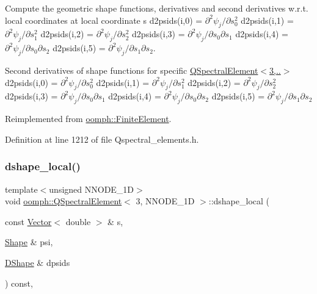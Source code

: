 Compute the geometric shape functions, derivatives and second derivatives w.\+r.\+t. local coordinates at local coordinate s d2psids(i,0) = $ \partial ^2 \psi_j / \partial s_0^2 $ d2psids(i,1) = $ \partial ^2 \psi_j / \partial s_1^2 $ d2psids(i,2) = $ \partial ^2 \psi_j / \partial s_2^2 $ d2psids(i,3) = $ \partial ^2 \psi_j / \partial s_0 \partial s_1 $ d2psids(i,4) = $ \partial ^2 \psi_j / \partial s_0 \partial s_2 $ d2psids(i,5) = $ \partial ^2 \psi_j / \partial s_1 \partial s_2 $. 

Second derivatives of shape functions for specific \hyperlink{classoomph_1_1QSpectralElement_3_013_00_01NNODE__1D_01_4_a16dc807addb7036c30d794d65d2a0b73}{Q\+Spectral\+Element$<$3,..$>$} d2psids(i,0) = $ \partial ^2 \psi_j / \partial s_0^2 $ d2psids(i,1) = $ \partial ^2 \psi_j / \partial s_1^2 $ d2psids(i,2) = $ \partial ^2 \psi_j / \partial s_2^2 $ d2psids(i,3) = $ \partial ^2 \psi_j / \partial s_0 \partial s_1 $ d2psids(i,4) = $ \partial ^2 \psi_j / \partial s_0 \partial s_2 $ d2psids(i,5) = $ \partial ^2 \psi_j / \partial s_1 \partial s_2 $ 

Reimplemented from \hyperlink{classoomph_1_1FiniteElement_a53e5051582d9da07b9d35da9debd0cd7}{oomph\+::\+Finite\+Element}.



Definition at line 1212 of file Qspectral\+\_\+elements.\+h.

\mbox{\label{classoomph_1_1QSpectralElement_3_013_00_01NNODE__1D_01_4_ace199b14b89f1816a92e94f94cd808ff}} 
\subsubsection{\texorpdfstring{dshape\+\_\+local()}{dshape\_local()}}
{\footnotesize\ttfamily template$<$unsigned N\+N\+O\+D\+E\+\_\+1D$>$ \\
void \hyperlink{classoomph_1_1QSpectralElement}{oomph\+::\+Q\+Spectral\+Element}$<$ 3, N\+N\+O\+D\+E\+\_\+1D $>$\+::dshape\+\_\+local (\begin{DoxyParamCaption}\item[{const \hyperlink{classoomph_1_1Vector}{Vector}$<$ double $>$ \&}]{s,  }\item[{\hyperlink{classoomph_1_1Shape}{Shape} \&}]{psi,  }\item[{\hyperlink{classoomph_1_1DShape}{D\+Shape} \&}]{dpsids }\end{DoxyParamCaption}) const\hspace{0.3cm}{\ttfamily [inline]}, {\ttfamily [virtual]}}



